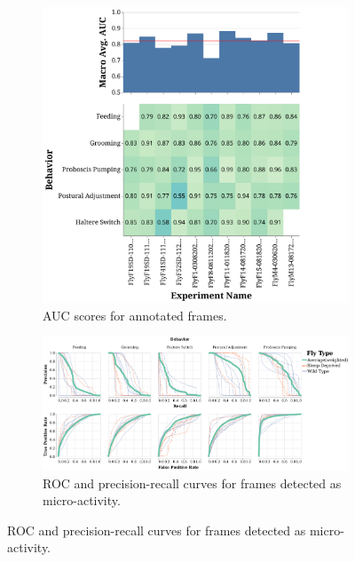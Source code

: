 \begin{figure}[htb!]
\begin{subfigure}[ht!]{0.495\linewidth}
		\centering\includegraphics[width=\linewidth]{figures/AUC_ROC-DAnnfiltered.pdf}
		\caption{AUC scores for annotated frames. \label{figure:AUC-ROC-Ann}}
	\end{subfigure}%

	\begin{subfigure}[ht!]{0.95\linewidth}
		\centering\includegraphics[width=\linewidth]{figures/PRC_ROC-DActfiltered.pdf}
		\caption{ROC and precision-recall curves for frames detected as micro-activity. \label{figure:ROC-PRC-Act}}
	\end{subfigure}%


\end{figure}
